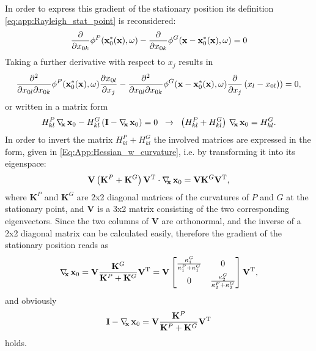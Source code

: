 In order to express this gradient of the stationary position its definition \eqref{eq:app:Rayleigh_stat_point} is reconsidered:
\begin{equation}
\frac{\partial}{\partial x_{0 k}} \phi^P(\mathbf{x}_0^*(\mathbf{x}),\omega) - \frac{\partial}{\partial x_{0 k}}\phi^G(\mathbf{x}-\mathbf{x}_0^*(\mathbf{x}),\omega)  = 0
\end{equation}
Taking a further derivative with respect to $x_j$ results in
\begin{equation}
\frac{\partial^2}{\partial x_{0 l} \partial x_{0 k}} \phi^P(\mathbf{x}_0^*(\mathbf{x}),\omega) \frac{\partial x_{0 l}}{\partial x_j}
- \frac{\partial^2}{\partial x_{0 l} \partial x_{0 k}} \phi^G(\mathbf{x}-\mathbf{x}_0^*(\mathbf{x}),\omega)  \frac{\partial}{\partial x_j} \left( x_l - x_{0 l} ) \right) = 0,
\end{equation}
or written in a matrix form
\begin{equation}
H^P_{kl} \, \nabla_{\!\!\mathbf{x}}\, \mathbf{x}_0 - H^G_{kl} \left( \mathbf{I} - \nabla_{\!\!\mathbf{x}}\, \mathbf{x}_0 \right) = 0 \hspace{2mm} \rightarrow \hspace{2mm} \left( H^P_{kl} +  H^G_{kl} \right) \, \nabla_{\!\!\mathbf{x}}\, \mathbf{x}_0 = H^G_{kl}. 
\end{equation}
In order to invert the matrix $H^P_{kl} +  H^G_{kl}$ the involved matrices are expressed in the form, given in \eqref{Eq:App:Hessian_w_curvature}, i.e. by transforming it into its eigenspace:
\begin{equation}
 \mathbf{V} \left( \mathbf{K}^P + \mathbf{K}^G \right) \mathbf{V}^{\mathrm{T}} \cdot \nabla_{\!\!\mathbf{x}}\, \mathbf{x}_0 =   \mathbf{V} \mathbf{K}^G \mathbf{V}^{\mathrm{T}},
\end{equation}
where $\mathbf{K}^P$ and $\mathbf{K}^G$ are 2x2 diagonal matrices of the curvatures of $P$ and $G$ at  the stationary point, and $\mathbf{V}$ is a 3x2 matrix consisting of the two corresponding eigenvectors.
Since the two columns of $\mathbf{V}$ are orthonormal, and the inverse of a 2x2 diagonal matrix can be calculated easily, therefore the gradient of the stationary position reads as
\begin{equation}
\nabla_{\!\!\mathbf{x}}\, \mathbf{x}_0 =  \mathbf{V} \frac{\mathbf{K}^G}{\mathbf{K}^P + \mathbf{K}^G} \mathbf{V}^{\mathrm{T}} = 
\mathbf{V} 
\begin{bmatrix}
\frac{\kappa_1^G}{\kappa_1^P + \kappa_1^G} & 0 \\[.5em]
0 & \frac{\kappa_2^G}{\kappa_2^P + \kappa_2^G}
\\[0.3em]    \end{bmatrix}
\mathbf{V}^{\mathrm{T}},
\end{equation}
and obviously
\begin{equation}
\mathbf{I} - \nabla_{\!\!\mathbf{x}}\, \mathbf{x}_0 =  \mathbf{V} \frac{\mathbf{K}^P}{\mathbf{K}^P + \mathbf{K}^G} \mathbf{V}^{\mathrm{T}}
\end{equation}
holds.
	
